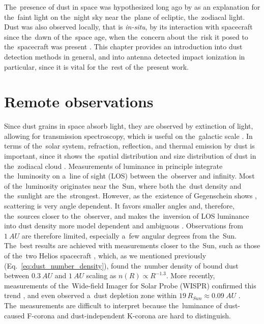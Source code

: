 The~presence of dust in space was hypothesized long ago by \citet{cassini1685} as an explanation for the~faint light on the~night sky near the~plane of ecliptic, the~zodiacal light. Dust was also observed locally, that is \textit{in-situ}, by its interaction with spacecraft since the~dawn of the~space age, when the~concern about the~risk it posed to the~spacecraft was present \citep{whipple1958meteoritic}. This chapter provides an introduction into dust detection methods in general, and into antenna detected impact ionization in particular, since it is vital for the~rest of the~present work.

\section{Remote observations}

Since dust grains in space absorb light, they are observed by extinction of light, \citep{desert1990interstellar} allowing for transmission spectroscopy, which is useful on the~galactic scale \citep{mann2010interstellar}. In terms of the~solar system, refraction, reflection, and thermal emission by dust is important, since it shows the~spatial distribution and size distribution of dust in the~zodiacal cloud \citep{allen1946spectrum,hulst1947zodiacal,leinert1981zodiacal,stenborg2018characterization,stenborg2021psp}. Measurements of luminance in principle integrate the~luminosity on a~line of sight ({LOS}) between the~observer and infinity. Most of the~luminosity originates near the~Sun, where both the~dust density and the~sunlight are the~strongest. However, as the~existence of Gegenschein shows \citep{roosen1971gegenschein}, scattering is very angle dependent. It favors smaller angles and, therefore, the~sources closer to the~observer, and makes the~inversion of LOS luminance into dust density more model dependent and ambiguous \citep{mann2004dust,kneissel1991spatial}. Observations from $\SI{1}{AU}$ are therefore limited, especially a~few angular degrees from the~Sun. The~best results are achieved with measurements closer to the~Sun, such as those of the~two Helios spacecraft \citep{leinert1981zodiacal}, which, as we mentioned previously (Eq.~\ref{eq:dust_number_density}), found the~number density of bound dust between $\SI{0.3}{AU}$ and $\SI{1}{AU}$ scaling as $n(R) \propto R^{-1.3}$. More recently, measurements of the~Wide-field Imager for Solar Probe ({WISPR}) confirmed this trend \citep{stenborg2021psp}, and even observed a~dust depletion zone within $19 \, R_{Sun} \approx \SI{0.09}{AU}$ \citep{stenborg2022psp}. The~measurements are difficult to interpret because the~luminance of dust-caused F-corona and dust-independent K-corona are hard to distinguish. 

